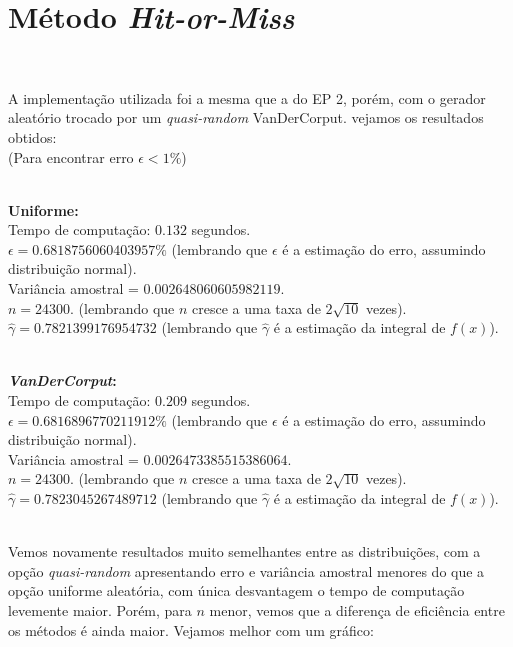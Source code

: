 \documentclass[pt12]{article}
\begin{document}
\section{Método \textit{Hit-or-Miss}}
\ 

A implementação utilizada foi a mesma que a do EP 2, porém, com o gerador aleatório trocado por um \textit{quasi-random} VanDerCorput. vejamos os resultados obtidos:\\
(Para encontrar erro $\epsilon<1\%$)\\
\ 

\textbf{Uniforme:}\\
\noindent Tempo de computação: $0.132$ segundos.\\
\noindent $\epsilon = 0.6818756060403957\%$ (lembrando que $\epsilon$ é a estimação do erro, assumindo distribuição normal).\\
\noindent Variância amostral = $0.002648060605982119$.\\
\noindent $n = 24300$. (lembrando que $n$ cresce a uma taxa de $2\sqrt{10}$ vezes).\\
\noindent $\hat{\gamma} = 0.7821399176954732$ (lembrando que $\hat{\gamma}$ é a estimação da integral de $f(x)$).\\
\ 

\textbf{\textit{VanDerCorput}:}\\
\noindent Tempo de computação: $0.209$ segundos.\\
\noindent $\epsilon = 0.6816896770211912\%$ (lembrando que $\epsilon$ é a estimação do erro, assumindo distribuição normal).\\
\noindent Variância amostral = $0.0026473385515386064$.\\
\noindent $n = 24300$. (lembrando que $n$ cresce a uma taxa de $2\sqrt{10}$ vezes).\\
\noindent $\hat{\gamma} = 0.7823045267489712$ (lembrando que $\hat{\gamma}$ é a estimação da integral de $f(x)$).\\
\ 

Vemos novamente resultados muito semelhantes entre as distribuições, com a opção \textit{quasi-random} apresentando erro e variância amostral menores do que a opção uniforme aleatória, com única desvantagem o tempo de computação levemente maior. Porém, para $n$ menor, vemos que a diferença de eficiência entre os métodos é ainda maior. Vejamos melhor com um gráfico:\\
\ 
\end{document}
